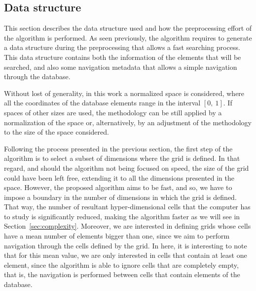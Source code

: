 \documentclass[preprint,12pt]{elsarticle}
\begin{document}
\subsection{Data structure}
\label{sec:structure}

This section describes the data structure used and how the preprocessing effort of the algorithm is performed. As seen previously, the algorithm requires to generate a data structure during the preprocessing that allows a fast searching process. This data structure contains both the information of the elements that will be searched, and also some navigation metadata that allows a simple navigation through the database.

Without lost of generality, in this work a normalized space is considered, where all the coordinates of the database elements range in the interval $[0,\: 1]$. If spaces of other sizes are used, the methodology can be still applied by a normalization of the space or, alternatively, by an adjustment of the methodology to the size of the space considered.

Following the process presented in the previous section, the first step of the algorithm is to select a subset of dimensions where the grid is defined. In that regard, and should the algorithm not being focused on speed, the size of the grid could have been left free, extending it to all the dimensions presented in the space. However, the proposed algorithm aims to be fast, and so, we have to impose a boundary in the number of dimensions in which the grid is defined. That way, the number of resultant hyper-dimensional cells that the computer has to study is significantly reduced, making the algorithm faster as we will see in Section~\ref{sec:complexity}. Moreover, we are interested in defining grids whose cells have a mean number of elements bigger than one, since we aim to perform navigation through the cells defined by the grid. In here, it is interesting to note that for this mean value, we are only interested in cells that contain at least one element, since the algorithm is able to ignore cells that are completely empty, that is, the navigation is performed between cells that contain elements of the database. 
\end{document}
